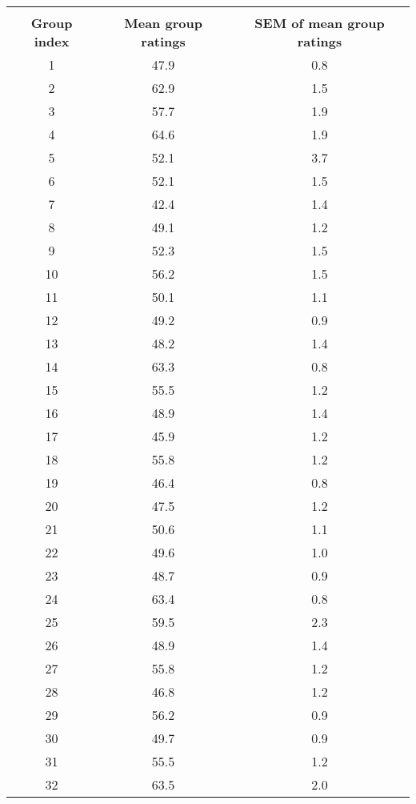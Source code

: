 \begin{fullwidth}
\begin{table}[!ht]
    \footnotesize
    \begin{tabular}{c|c|c}
        \multicolumn{3}{c}{\textbf{}} \\
        \textbf{Group index} & \textbf{Mean group ratings} & \textbf{SEM of mean group ratings} \\ \hline
        1 & 47.9 & 0.8 \\
        2 & 62.9 & 1.5 \\
        3 & 57.7 & 1.9 \\
        4 & 64.6 & 1.9 \\
        5 & 52.1 & 3.7 \\
        6 & 52.1 & 1.5 \\
        7 & 42.4 & 1.4 \\
        8 & 49.1 & 1.2 \\
        9 & 52.3 & 1.5 \\
        10 & 56.2 & 1.5 \\
        11 & 50.1 & 1.1 \\
        12 & 49.2 & 0.9 \\
        13 & 48.2 & 1.4 \\
        14 & 63.3 & 0.8 \\
        15 & 55.5 & 1.2 \\
        16 & 48.9 & 1.4 \\
        17 & 45.9 & 1.2 \\
        18 & 55.8 & 1.2 \\
        19 & 46.4 & 0.8 \\
        20 & 47.5 & 1.2 \\
        21 & 50.6 & 1.1 \\
        22 & 49.6 & 1.0 \\
        23 & 48.7 & 0.9 \\
        24 & 63.4 & 0.8 \\
        25 & 59.5 & 2.3 \\
        26 & 48.9 & 1.4 \\
        27 & 55.8 & 1.2 \\
        28 & 46.8 & 1.2 \\
        29 & 56.2 & 0.9 \\
        30 & 49.7 & 0.9 \\
        31 & 55.5 & 1.2 \\
        32 & 63.5 & 2.0 \\

\end{tabular}
\end{table}
\end{fullwidth}
